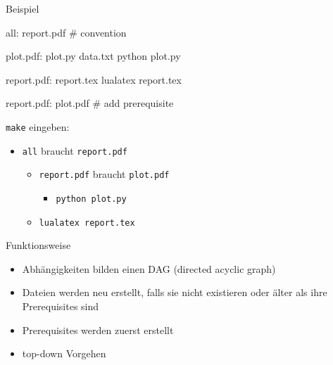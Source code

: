 \begin{frame}[fragile]{Beispiel}
  \begin{center}
    \begin{lstmake}
      all: report.pdf  # convention

      plot.pdf: plot.py data.txt
          python plot.py

      report.pdf: report.tex
          lualatex report.tex

      report.pdf: plot.pdf  # add prerequisite
    \end{lstmake}
  \end{center}
  \vspace{1em}

  \texttt{make} eingeben:
  \begin{itemize}
    \item \texttt{all} braucht \texttt{report.pdf}
      \begin{itemize}
        \item \texttt{report.pdf} braucht \texttt{plot.pdf}
          \begin{itemize}
            \item \texttt{python plot.py}
          \end{itemize}
        \item \texttt{lualatex report.tex}
    \end{itemize}
  \end{itemize}
\end{frame}

\begin{frame}{Funktionsweise}
  \begin{center}
  \end{center}

  \begin{itemize}
    \item Abhängigkeiten bilden einen DAG (directed acyclic graph)
    \item Dateien werden neu erstellt, falls sie nicht existieren oder älter als ihre Prerequisites sind
    \item Prerequisites werden zuerst erstellt
    \item top-down Vorgehen
  \end{itemize}
\end{frame}

